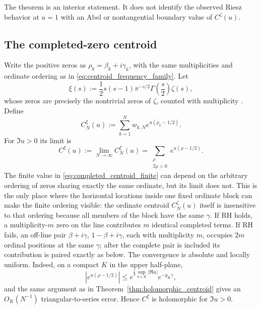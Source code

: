 \documentclass[11pt]{amsart}
\numberwithin{equation}{section}
\theoremstyle{definition}
\theoremstyle{remark}
\begin{document}
The theorem is an interior statement. It does not identify the observed Riesz behavior at $u=1$ with an Abel or nontangential boundary value of $C^{\zeta}(u)$.

\subsection{The completed-zero centroid}\label{subsec:completed_zero_centroid}
Write the positive zeros as $\rho_k=\beta_k+i\gamma_k$, with the same multiplicities and ordinate ordering as in \eqref{eq:centroid_frequency_family}. Let
\begin{equation}\label{eq:xi_definition_centroid}
\xi(s):=\frac12s(s-1)\pi^{-s/2}\Gamma\!\left(\frac{s}{2}\right)\zeta(s),
\end{equation}
whose zeros are precisely the nontrivial zeros of $\zeta$, counted with multiplicity \cite{Titchmarsh1986,Edwards1974,DLMF}. Define
\begin{equation}\label{eq:completed_centroid_finite}
C_N^{\xi}(u):=\sum_{k=1}^{N}w_{k,N}e^{u(\rho_k-1/2)}.
\end{equation}
For $\Im u>0$ its limit is
\begin{equation}\label{eq:completed_centroid}
\boxed{C^{\xi}(u):=\lim_{N\to\infty}C_N^{\xi}(u)
=\sum_{\substack{\rho\\ \Im\rho>0}}e^{u(\rho-1/2)}.}
\end{equation}
The finite value in \eqref{eq:completed_centroid_finite} can depend on the arbitrary ordering of zeros sharing exactly the same ordinate, but its limit does not. This is the only place where the horizontal locations inside one fixed ordinate block can make the finite ordering visible: the ordinate centroid $C_N^{\zeta}(u)$ itself is insensitive to that ordering because all members of the block have the same $\gamma$. If RH holds, a multiplicity-$m$ zero on the line contributes $m$ identical completed terms. If RH fails, an off-line pair $\beta+i\gamma$, $1-\beta+i\gamma$, each with multiplicity $m$, occupies $2m$ ordinal positions at the same $\gamma$; after the complete pair is included its contribution is paired exactly as below. The convergence is absolute and locally uniform. Indeed, on a compact $K$ in the upper half-plane,
\begin{equation}\label{eq:completed_centroid_decay}
|e^{u(\rho-1/2)}|
\le e^{\frac12\sup_{u\in K}|\Re u|}e^{-y_K\gamma},
\end{equation}
and the same argument as in Theorem~\ref{thm:holomorphic_centroid} gives an $O_K(N^{-1})$ triangular-to-series error. Hence $C^{\xi}$ is holomorphic for $\Im u>0$.
\end{document}
